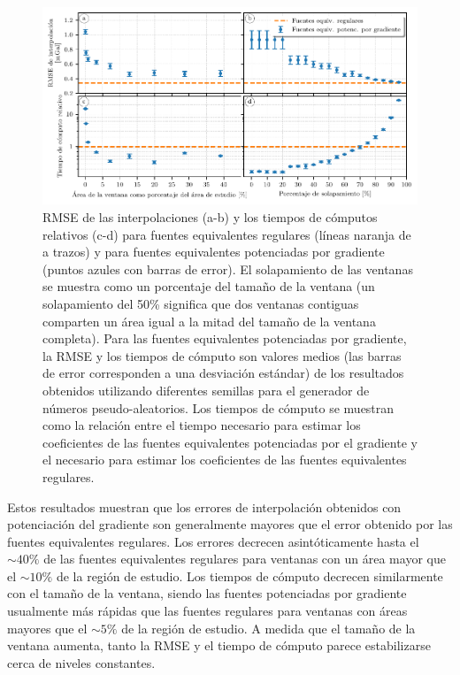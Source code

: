 \begin{figure}[tb]
    \includegraphics[width=\linewidth]{figs/eql-gradient-boosted/gradient-boosted-comparisons.pdf}
    \caption{
        \acs{RMSE} de las interpolaciones (a-b) y los tiempos de cómputos
        relativos (c-d) para fuentes equivalentes regulares (líneas naranja de
        a trazos) y para fuentes equivalentes potenciadas por gradiente
        (puntos azules con barras de error).
        El solapamiento de las ventanas se muestra como un porcentaje del
        tamaño de la ventana (un solapamiento del 50\% significa que dos
        ventanas contiguas comparten un área igual a la mitad del tamaño de la
        ventana completa).
        Para las fuentes equivalentes potenciadas por gradiente, la
        \acs{RMSE} y los tiempos de cómputo son valores medios (las barras de
        error corresponden a una desviación estándar) de los resultados
        obtenidos utilizando diferentes semillas para el generador de números
        pseudo-aleatorios.
        Los tiempos de cómputo se muestran como la relación entre el tiempo
        necesario para estimar los coeficientes de las fuentes equivalentes
        potenciadas por el gradiente y el necesario para estimar los
        coeficientes de las fuentes equivalentes regulares.
    }
    \label{fig:gradient-boosted-comparison}
\end{figure}

Estos resultados muestran que los errores de interpolación obtenidos con
potenciación del gradiente son generalmente mayores que el error obtenido por
las fuentes equivalentes regulares.
Los errores decrecen asintóticamente hasta el $\sim 40\%$ de las fuentes
equivalentes regulares para ventanas con un área mayor que el $\sim 10\%$
de la región de estudio.
Los tiempos de cómputo decrecen similarmente con el tamaño de la ventana,
siendo las fuentes potenciadas por gradiente usualmente más rápidas que las
fuentes regulares para ventanas con áreas mayores que el $\sim 5\%$ de la
región de estudio.
A medida que el tamaño de la ventana aumenta, tanto la \ac{RMSE} y el tiempo de
cómputo parece estabilizarse cerca de niveles constantes.

